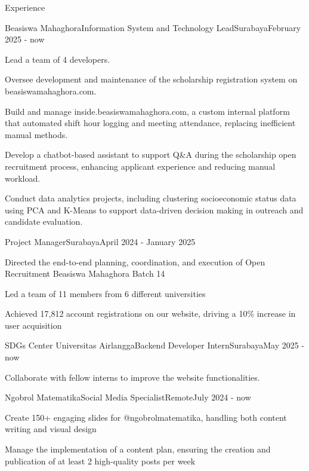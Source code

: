 \documentclass{article}
\newlength{\tabin}
\newlength{\secsep}
\newcommand{\lineunder}{\vspace*{-8pt} \\ \hspace*{-6pt} \hrulefill \\ \vspace*{-15pt}}
\newenvironment{tabbedsection}[1]{
  \begin{list}{}{
      \setlength{\itemsep}{0pt}
      \setlength{\labelsep}{0pt}
      \setlength{\labelwidth}{0pt}
      \setlength{\leftmargin}{\tabin}
      \setlength{\rightmargin}{\tabin}
      \setlength{\listparindent}{0pt}
      \setlength{\parsep}{0pt}
      \setlength{\parskip}{0pt}
      \setlength{\partopsep}{0pt}
      \setlength{\topsep}{#1}
    }
  \item[]
}{\end{list}}
\newenvironment{resume_section}[1]{
  \filbreak
  \vspace{2\secsep}
  \textsc{\large#1}
  \lineunder
  \begin{tabbedsection}{\secsep}
}{\end{tabbedsection}}
\newenvironment{subitems}{
  \renewcommand{\labelitemi}{-}
  \begin{itemize}
      \setlength{\labelsep}{1em}
}{\end{itemize}}
\newenvironment{resume_employer}[4]{
  \vspace{\secsep}
  \textbf{#1} \\ 
  \indent {\small #2} \hfill {\footnotesize#3 (#4)}
  \begin{tabbedsection}{0pt}
  \begin{subitems}
}{\end{subitems}\end{tabbedsection}}
\begin{document}
\begin{resume_section}{Experience}
\begin{resume_employer}{Beasiswa Mahaghora}{Information System and Technology Lead}{Surabaya}{February 2025 - now}
  \item Lead a team of 4 developers. 
  \item Oversee development and maintenance of the scholarship registration system on beasiswamahaghora.com.
  \item Build and manage inside.beasiswamahaghora.com, a custom internal platform that automated shift hour logging and meeting attendance, replacing inefficient manual methods.
  \item Develop a chatbot-based assistant to support Q\&A during the scholarship open recruitment process, enhancing applicant experience and reducing manual workload.
  \item Conduct data analytics projects, including clustering socioeconomic status data using PCA and K-Means to support data-driven decision making in outreach and candidate evaluation.
\end{resume_employer}

\renewcommand{\secsep}{-10pt}
\begin{resume_employer}{}{Project Manager}{Surabaya}{April 2024 - January 2025}
  \item Directed the end-to-end planning, coordination, and execution of Open Recruitment Beasiswa Mahaghora Batch 14
  \item Led a team of 11 members from 6 different universities
  \item Achieved 17,812 account registrations on our website, driving a 10\% increase in user acquisition
\end{resume_employer}
\renewcommand{\secsep}{0.1cm} %
  \begin{resume_employer}{SDGs Center Universitas Airlangga}{Backend Developer Intern}{Surabaya}{May 2025 - now}
    \item Collaborate with fellow interns to improve the website functionalities.
   \end{resume_employer}
  \begin{resume_employer}{Ngobrol Matematika}{Social Media Specialist}{Remote}{July 2024 - now}
    \item Create 150+ engaging slides for @ngobrolmatematika, handling both content writing and visual design
    \item Manage the implementation of a content plan, ensuring the creation and publication of at least 2 high-quality posts per week
   \end{resume_employer}
  
\end{resume_section}
\end{document}
